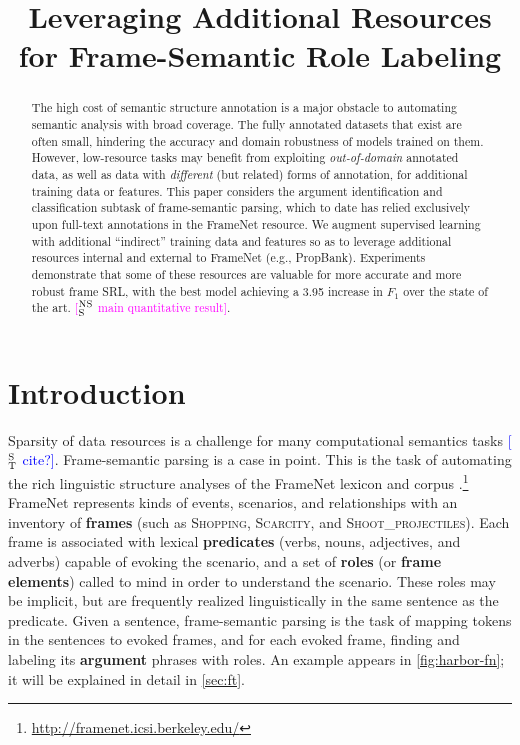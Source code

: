 \documentclass[11pt,a4paper]{article}
\title{Leveraging Additional Resources for Frame-Semantic Role Labeling}
\date{}
\newcommand{\ensuretext}[1]{#1}
\newcommand{\nssmarker}{\ensuretext{\textcolor{magenta}{\ensuremath{^{\textsc{NS}}_{\textsc{S}}}}}}
\newcommand{\stmarker}{\ensuretext{\textcolor{blue}{\ensuremath{^{\textsc{S}}_{\textsc{T}}}}}}
\newcommand{\arkcomment}[3]{\ensuretext{\textcolor{#3}{[#1 #2]}}}
\newcommand{\nss}[1]{\arkcomment{\nssmarker}{#1}{magenta}}
\newcommand{\st}[1]{\arkcomment{\stmarker}{#1}{blue}}
\newcommand{\fnf}[1]{\textsc{\textsf{#1}}} %
\begin{document}
\maketitle
\begin{abstract}
The high cost of semantic structure annotation is a major obstacle 
to automating semantic analysis with broad coverage.
The fully annotated datasets that exist are often small, 
hindering the accuracy and domain robustness of models trained on them.
However, low-resource tasks may benefit from exploiting \emph{out-of-domain} annotated data, 
as well as data with \emph{different} (but related) forms of annotation,
for additional training data or features.
This paper considers the argument identification and classification subtask 
of frame-semantic parsing, which to date has relied exclusively 
upon full-text annotations in the FrameNet resource. %
We augment supervised learning with additional 
``indirect'' training data and features 
so as to leverage additional resources internal and external to FrameNet (e.g., PropBank). 
Experiments demonstrate that some of these resources are valuable for 
more accurate and more robust frame SRL,
with the best model achieving a 3.95 increase in $F_1$ over the state of the art. \nss{main quantitative result}.
\end{abstract}

\section{Introduction}

Sparsity of data resources is a challenge for many computational semantics tasks \st{cite?}.
Frame-semantic parsing \citep{das-14} is a case in point.
This is the task of automating the rich linguistic structure analyses 
of the FrameNet lexicon and corpus \citep{baker-98}.\footnote{\url{http://framenet.icsi.berkeley.edu/}}
FrameNet represents kinds of events, scenarios, and relationships 
with an inventory of \textbf{frames} (such as \fnf{Shopping}, \fnf{Scarcity}, and \fnf{Shoot\_projectiles}). 
Each frame is associated with lexical \textbf{predicates} (verbs, nouns, adjectives, and adverbs) capable of 
evoking the scenario, and a set of \textbf{roles} (or \textbf{frame elements}) 
called to mind in order to understand the scenario. 
These roles may be implicit, 
but are frequently realized linguistically in the same sentence as the predicate.
Given a sentence, frame-semantic parsing is the task of mapping tokens in the sentences
to evoked frames, and for each evoked frame, finding and labeling its \textbf{argument} phrases 
with roles. 
An example appears in \cref{fig:harbor-fn}; it will be explained in detail in \cref{sec:ft}.
\end{document}
